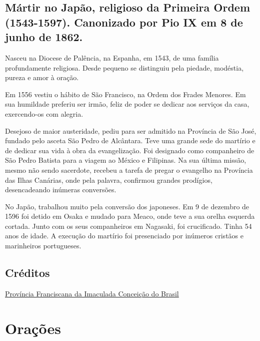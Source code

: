 \documentclass[11pt]{article}
\begin{document}
\begin{justify}

\subsection {Mártir no Japão, religioso da Primeira Ordem (1543-1597). Canonizado por Pio IX em 8 de junho de 1862.}

Nasceu na Diocese de Palência, na Espanha, em 1543, de uma família profundamente religiosa. Desde pequeno se distinguiu pela piedade, modéstia, pureza e amor à oração.

Em 1556 vestiu o hábito de São Francisco, na Ordem dos Frades Menores. Em sua humildade preferiu ser irmão, feliz de poder se dedicar aos serviços da casa, exercendo-os com alegria.

Desejoso de maior austeridade, pediu para ser admitido na Província de São José, fundado pelo asceta São Pedro de Alcântara. Teve uma grande sede do martírio e de dedicar sua vida à obra da evangelização. Foi designado como companheiro de São Pedro Batista para a viagem ao México e Filipinas. Na sua última missão, mesmo não sendo sacerdote, recebeu a tarefa de pregar o evangelho na Província das Ilhas Canárias, onde pela palavra, confirmou grandes prodígios, desencadeando inúmeras conversões.

No Japão, trabalhou muito pela conversão dos japoneses. Em 9 de dezembro de 1596 foi detido em Osaka e mudado para Meaco, onde teve a sua orelha esquerda cortada. Junto com os seus companheiros em Nagasaki, foi crucificado. Tinha 54 anos de idade. A execução do martírio foi presenciado por inúmeros cristãos e marinheiros portugueses.


\end{justify}

\subsection*{Créditos }
\href{https://franciscanos.org.br/carisma/calendario/sao-francisco-de-sao-miguel#gsc.tab=0}{Província Franciscana da Imaculada Conceição do Brasil}

\newpage


\section{Orações}\label{oracoes}
\end{document}

